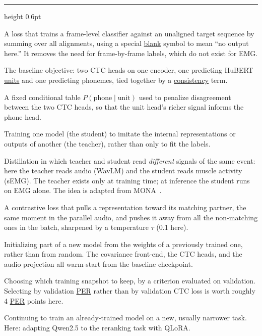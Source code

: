 \documentclass{article}
\providecommand{\textls}[2][]{#2}
\newcommand{\cathead}[1]{%
  \par\addvspace{15pt}\needspace{5\baselineskip}%
  \noindent{\normalsize\scshape\bfseries\textls[70]{#1}}\par
  \vspace{2.5pt}%
  {\color{rulegray}\hrule height 0.6pt}%
  \par\addvspace{8pt}%
}
\DeclareRobustCommand{\glref}[2]{\hyperlink{gl:#1}{\textcolor{glosslink}{#2}}}
\newcommand{\glentry}[2]{\item[\hypertarget{gl:#1}{#2}]}
\newenvironment{glosslist}
  {\begin{description}[style=nextline,leftmargin=2.1em,labelindent=0pt,
      itemsep=5pt,parsep=0pt,topsep=2pt,font=\normalfont\bfseries]}
  {\end{description}}
\DeclareRobustCommand{\per}{\glref{per}{PER}}
\begin{document}
\cathead{Training}
\begin{glosslist}

\glentry{ctc}{CTC \textnormal{(connectionist temporal classification)}}
A loss that trains a frame-level classifier against an unaligned target sequence by summing over all
alignments, using a special \glref{blank}{blank} symbol to mean ``no output here.'' It removes the need
for frame-by-frame labels, which do not exist for EMG.

\glentry{dualctc}{Dual-CTC}
The baseline objective: two CTC heads on one encoder, one predicting HuBERT \glref{unit}{units} and one
predicting phonemes, tied together by a \glref{consistency}{consistency} term.

\glentry{consistency}{Consistency table}
A fixed conditional table $P(\text{phone}\mid\text{unit})$ used to penalize disagreement between the two
CTC heads, so that the unit head's richer signal informs the phone head.

\glentry{distill}{Distillation}
Training one model (the student) to imitate the internal representations or outputs of another (the
teacher), rather than only to fit the labels.

\glentry{crossmodal}{Cross-modal distillation}
Distillation in which teacher and student read \emph{different} signals of the same event: here the
teacher reads audio (WavLM) and the student reads muscle activity (sEMG). The teacher exists only at
training time; at inference the student runs on EMG alone. The idea is adapted from
MONA~\citep{benster2024mona}.

\glentry{infonce}{InfoNCE}
A contrastive loss that pulls a representation toward its matching partner, the same moment in the
parallel audio, and pushes it away from all the non-matching ones in the batch, sharpened by a
temperature $\tau$ (0.1 here).

\glentry{warmstart}{Warm start}
Initializing part of a new model from the weights of a previously trained one, rather than from random.
The covariance front-end, the CTC heads, and the audio projection all warm-start from the baseline
checkpoint.

\glentry{ckpt}{Checkpoint selection}
Choosing which training snapshot to keep, by a criterion evaluated on validation. Selecting by
validation \per{} rather than by validation CTC loss is worth roughly 4 \per{} points here.

\glentry{ft}{Fine-tuning}
Continuing to train an already-trained model on a new, usually narrower task. Here: adapting Qwen2.5 to
the reranking task with QLoRA.


\end{glosslist}
\end{document}
